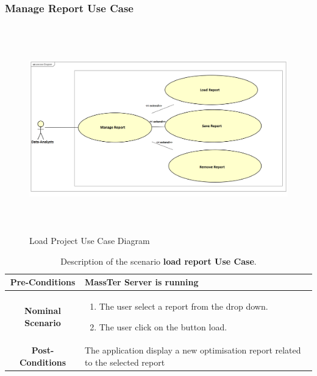  \subsubsection{Manage Report Use Case}
	 	\begin{figure}[h]
	\centering
	\includegraphics[width=16.5cm,height=9cm]{manageReport.png}
	\caption{Load Project Use Case Diagram}
	
\end{figure}

 \begin{table}
 	\caption{Description of the scenario \textbf{load report Use Case}.}
 	\label{DSTabLR}
 	\centering
 	\begin{tabular}{|c|p{10cm}|}
 		\hline 	
 		\textbf{Pre-Conditions } & MassTer Server is running \\ 
 		\hline                     
 		\textbf{Nominal Scenario } &  \begin{enumerate}
 			\item The user select a report from the drop down.
 			\item The user click on the button load.
 		\end{enumerate} \\ 
 		\hline 
 		\textbf{Post-Conditions} & The application display a new optimisation report related to the selected report \\
 		\hline 
 	\end{tabular}
 \end{table}
 
